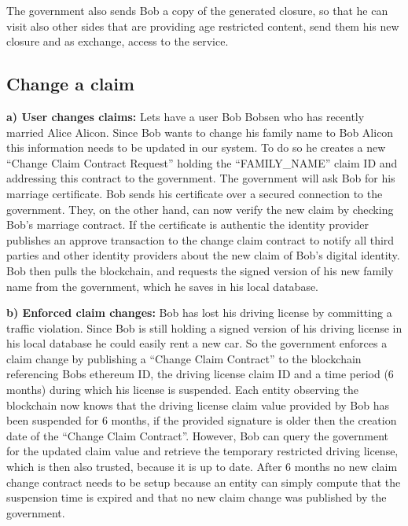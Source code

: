 The government also sends Bob a copy of the generated closure, so that he can visit also other sides that are providing age restricted content, send them his new closure and as exchange, access to the service. 

\subsection{Change a claim}
\label{sec:changeClaimUseCase}
\textbf{a) User changes claims:}
Lets have a user Bob Bobsen who has recently married Alice Alicon. Since Bob wants to change his family name to Bob Alicon this information needs to be updated in our system. To do so he creates a new “Change Claim Contract Request” holding the “FAMILY\_NAME” claim ID and addressing this contract to the government. The government will ask Bob for his marriage certificate. Bob sends his certificate over a secured connection to the government. They, on the other hand, can now verify the new claim by checking Bob's marriage contract. If the certificate is authentic the identity provider publishes an approve transaction to the change claim contract to notify all third parties and other identity providers about the new claim of Bob's digital identity.
Bob then pulls the blockchain, and requests the signed version of his new family name from the government, which he saves in his local database.

\textbf{b) Enforced claim changes:}
Bob has lost his driving license by committing a traffic violation. Since Bob is still holding a signed version of his driving license in his local database he could easily rent a new car. So the government enforces a claim change by publishing a “Change Claim Contract” to the blockchain referencing Bobs ethereum ID, the driving license claim ID and a time period (6 months) during which his license is suspended. Each entity observing the blockchain now knows that the driving license claim value provided by Bob has been suspended for 6 months, if the provided signature is older then the creation date of the “Change Claim Contract”. However, Bob can query the government for the updated claim value and retrieve the temporary restricted driving license, which is then also trusted, because it is up to date. After 6 months no new claim change contract needs to be setup because an entity can simply compute that the suspension time is expired and that no new claim change was published by the government.
